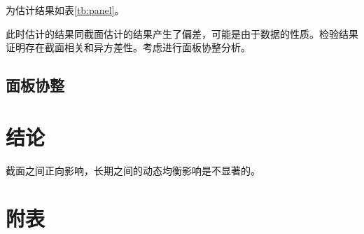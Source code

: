\documentclass[10pt]{article}
\begin{document}
    为估计结果如表\ref{tb:panel}。


    此时估计的结果同截面估计的结果产生了偏差，可能是由于数据的性质。检验结果证明存在截面相关和异方差性。考虑进行面板协整分析。

\subsection{面板协整}


\section{结论}
截面之间正向影响，长期之间的动态均衡影响是不显著的。

\renewcommand\refname{参考文献}
%	


\clearpage
\appendix
\section{附表}
\end{document}

